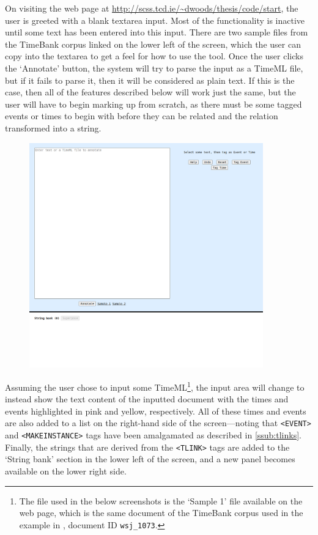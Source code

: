 \documentclass[a4paper,12pt,leqno]{article}
\begin{document}
On visiting the web page at \url{http://scss.tcd.ie/~dwoods/thesis/code/start}, the user is greeted with a blank textarea input. Most of the functionality is inactive until some text has been entered into this input. There are two sample files from the TimeBank corpus \citep{pustejovsky2006timebank} linked on the lower left of the screen, which the user can copy into the textarea to get a feel for how to use the tool. Once the user clicks the `Annotate' button, the system will try to parse the input as a TimeML file, but if it fails to parse it, then it will be considered as plain text. If this is the case, then all of the features described below will work just the same, but the user will have to begin marking up from scratch, as there must be some tagged events or times to begin with before they can be related and the relation transformed into a string.
\begin{center}
	\begin{figure}[h!]
		\centering
		\includegraphics[width=0.9\textwidth]{images/START-blank.png}
	\end{figure}
\end{center}
Assuming the user chose to input some TimeML\footnote{The file used in the below screenshots is the `Sample 1' file available on the web page, which is the same document of the TimeBank corpus used in the example in , document ID \texttt{wsj\_1073}.}, the input area will change to instead show the text content of the inputted document with the times and events highlighted in pink and yellow, respectively. All of these times and events are also added to a list on the right-hand side of the screen---noting that \verb|<EVENT>| and \verb|<MAKEINSTANCE>| tags have been amalgamated as described in \cref{ssub:tlinks}. Finally, the strings that are derived from the \verb|<TLINK>| tags are added to the `String bank' section in the lower left of the screen, and a new panel becomes available on the lower right side.
\end{document}
